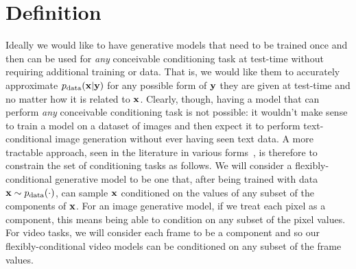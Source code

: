 \section{Definition}
Ideally we would like to have generative models that need to be trained once and then can be used for \textit{any} conceivable conditioning task at test-time without requiring additional training or data. That is, we would like them to accurately approximate $p_{\rm{data}}({\mathbf{x}}|{\mathbf{y}})$ for any possible form of ${\mathbf{y}}$ they are given at test-time and no matter how it is related to ${\mathbf{x}}$. Clearly, though, having a model that can perform \textit{any} conceivable conditioning task is not possible: it wouldn't make sense to train a model on a dataset of images and then expect it to perform text-conditional image generation without ever having seen text data. 
%
%
A more tractable approach, seen in the literature in various forms~\citep{ivanov2018variational,tashiro2021csdi,garnelo2018neural}, is therefore to constrain the set of conditioning tasks as follows. We will consider a flexibly-conditional generative model to be one that, after being trained with data ${\mathbf{x}} \sim p_{\rm{data}}(\cdot)$, can sample ${\mathbf{x}}$ conditioned on the values of any subset of the components of ${\mathbf{x}}$. For an image generative model, if we treat each pixel as a component, this means being able to condition on any subset of the pixel values. For video tasks, we will consider each frame to be a component and so our flexibly-conditional video models can be conditioned on any subset of the frame values.

